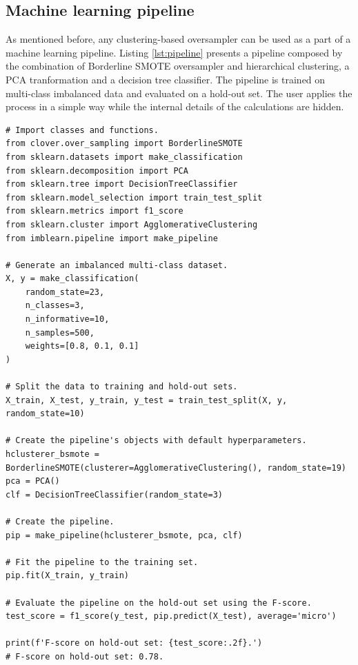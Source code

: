 \documentclass[preprint,12pt, a4paper]{elsarticle}
\begin{document}
\subsection{Machine learning pipeline}

As mentioned before, any clustering-based oversampler can be used as a part of a machine learning pipeline. Listing \ref{lst:pipeline} presents a pipeline composed by the combination of Borderline SMOTE oversampler and hierarchical clustering, a PCA tranformation and a decision tree classifier. The pipeline is trained on multi-class imbalanced data and evaluated on a hold-out set. The user applies the process in a simple way while the internal details of the calculations are hidden.

\begin{lstlisting}[caption={Training and evaluation of a machine learning pipeline that contains the AgglomerativeClustering-BorderlineSMOTE algorithm.},label={lst:pipeline}]
# Import classes and functions.
from clover.over_sampling import BorderlineSMOTE
from sklearn.datasets import make_classification
from sklearn.decomposition import PCA
from sklearn.tree import DecisionTreeClassifier
from sklearn.model_selection import train_test_split
from sklearn.metrics import f1_score
from sklearn.cluster import AgglomerativeClustering
from imblearn.pipeline import make_pipeline

# Generate an imbalanced multi-class dataset.
X, y = make_classification(
	random_state=23, 
	n_classes=3, 
	n_informative=10,
	n_samples=500,
	weights=[0.8, 0.1, 0.1]
)

# Split the data to training and hold-out sets.
X_train, X_test, y_train, y_test = train_test_split(X, y, random_state=10)

# Create the pipeline's objects with default hyperparameters.
hclusterer_bsmote = BorderlineSMOTE(clusterer=AgglomerativeClustering(), random_state=19)
pca = PCA()
clf = DecisionTreeClassifier(random_state=3)

# Create the pipeline.
pip = make_pipeline(hclusterer_bsmote, pca, clf)

# Fit the pipeline to the training set.
pip.fit(X_train, y_train)

# Evaluate the pipeline on the hold-out set using the F-score.
test_score = f1_score(y_test, pip.predict(X_test), average='micro')

print(f'F-score on hold-out set: {test_score:.2f}.')
# F-score on hold-out set: 0.78.
\end{lstlisting}
\end{document}
